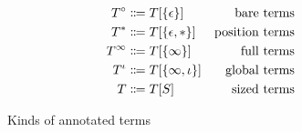 \begin{figure}
\centering
\begin{align*}
T^\circ  &\Coloneqq T[\{\epsilon\}]      &\text{bare terms} \\
T^*      &\Coloneqq T[\{\epsilon, *\}]   &\text{position terms} \\
T^\infty &\Coloneqq T[\{\infty\}]        &\text{full terms} \\
T^\iota  &\Coloneqq T[\{\infty, \iota\}] &\text{global terms} \\
T        &\Coloneqq T[S]                   &\text{sized terms}
\end{align*}
\caption{Kinds of annotated terms}
\label{fig:terms-specific}
\end{figure}